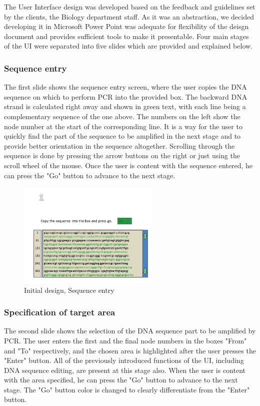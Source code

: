 The User Interface design was developed based on the feedback and guidelines set by the clients, the Biology department staff. As it was an abstraction, we decided developing it in Microsoft Power Point was adequate for flexibility of the deisgn document and provides sufficient tools to make it presentable. Four main stages of the UI were separated into five slides which are provided and explained below.


\subsubsection{Sequence entry}
The first slide shows the sequence entry screen, where the user copies the DNA sequence on which to perform PCR into the provided box. The backward DNA strand is calculated right away and shown in green text, with each line being a complementary sequence of the one above. The numbers on the left show the node number at the start of the corresponding line. It is a way for the user to quickly find the part of the sequence to be amplified in the next stage and to provide better orientation in the sequence altogether. Scrolling through the sequence is done by pressing the arrow buttons on the right or just using the scroll wheel of the mouse. Once the user is content with the sequence entered, he can press the "Go" button to advance to the next stage.

\begin{figure}[h]
  \begin{center}
	\includegraphics[width=0.6\textwidth]{./images/UiDes/Slide1.jpg}
    \caption{
      \label{fig:UiDes:slide1}
      Initial design, Sequence entry
    }
  \end{center}
\end{figure}

\subsubsection{Specification of target area}
The second slide shows the selection of the DNA sequence part to be amplified by PCR. The user enters the first and the final node numbers in the boxes "From" and "To" respectively, and the chosen area is highlighted after the user presses the "Enter" button. All of the previously introduced functions of the UI, including DNA sequence editing, are present at this stage also. When the user is content with the area specified, he can press the "Go" button to advance to the next stage. The "Go" button color is changed to clearly differentiate from the "Enter" button.

